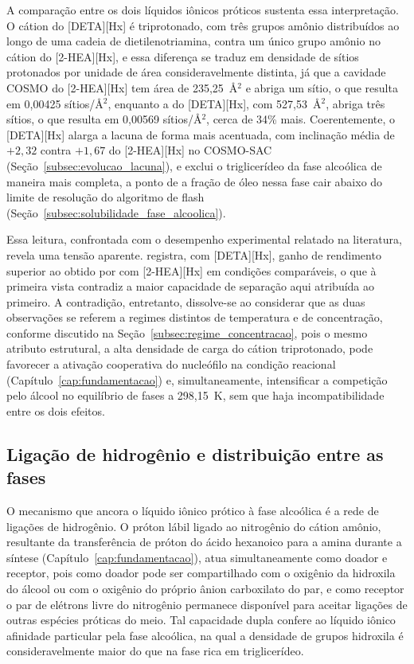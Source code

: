 A comparação entre os dois líquidos iônicos próticos sustenta essa interpretação. O cátion do [DETA][Hx] é triprotonado, com três grupos amônio distribuídos ao longo de uma cadeia de dietilenotriamina, contra um único grupo amônio no cátion do [2-HEA][Hx], e essa diferença se traduz em densidade de sítios protonados por unidade de área consideravelmente distinta, já que a cavidade COSMO do [2-HEA][Hx] tem área de 235,25~\AA$^2$ e abriga um sítio, o que resulta em 0,00425 sítios/\AA$^2$, enquanto a do [DETA][Hx], com 527,53~\AA$^2$, abriga três sítios, o que resulta em 0,00569 sítios/\AA$^2$, cerca de 34\% mais. Coerentemente, o [DETA][Hx] alarga a lacuna de forma mais acentuada, com inclinação média de $+2{,}32$ contra $+1{,}67$ do [2-HEA][Hx] no COSMO-SAC (Seção~\ref{subsec:evolucao_lacuna}), e exclui o triglicerídeo da fase alcoólica de maneira mais completa, a ponto de a fração de óleo nessa fase cair abaixo do limite de resolução do algoritmo de flash (Seção~\ref{subsec:solubilidade_fase_alcoolica}).

Essa leitura, confrontada com o desempenho experimental relatado na literatura, revela uma tensão aparente.  registra, com [DETA][Hx], ganho de rendimento superior ao obtido por  com [2-HEA][Hx] em condições comparáveis, o que à primeira vista contradiz a maior capacidade de separação aqui atribuída ao primeiro. A contradição, entretanto, dissolve-se ao considerar que as duas observações se referem a regimes distintos de temperatura e de concentração, conforme discutido na Seção~\ref{subsec:regime_concentracao}, pois o mesmo atributo estrutural, a alta densidade de carga do cátion triprotonado, pode favorecer a ativação cooperativa do nucleófilo na condição reacional (Capítulo~\ref{cap:fundamentacao}) e, simultaneamente, intensificar a competição pelo álcool no equilíbrio de fases a 298,15~K, sem que haja incompatibilidade entre os dois efeitos.

\subsection{Ligação de hidrogênio e distribuição entre as fases}
\label{subsec:ligacao_hidrogenio}

O mecanismo que ancora o líquido iônico prótico à fase alcoólica é a rede de ligações de hidrogênio. O próton lábil ligado ao nitrogênio do cátion amônio, resultante da transferência de próton do ácido hexanoico para a amina durante a síntese (Capítulo~\ref{cap:fundamentacao}), atua simultaneamente como doador e receptor, pois como doador pode ser compartilhado com o oxigênio da hidroxila do álcool ou com o oxigênio do próprio ânion carboxilato do par, e como receptor o par de elétrons livre do nitrogênio permanece disponível para aceitar ligações de outras espécies próticas do meio. Tal capacidade dupla confere ao líquido iônico afinidade particular pela fase alcoólica, na qual a densidade de grupos hidroxila é consideravelmente maior do que na fase rica em triglicerídeo.

